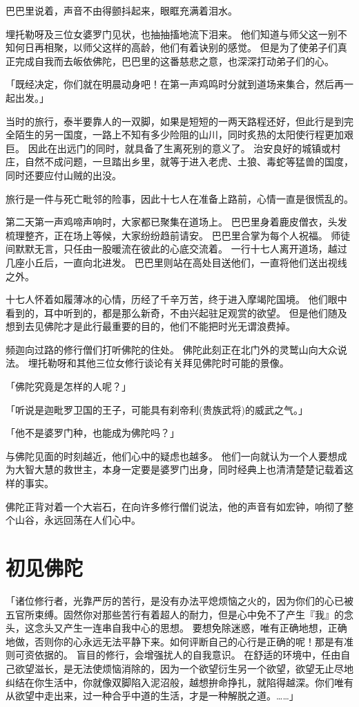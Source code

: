 \documentclass[twoside,openany]{book}
\begin{document}
巴巴里说着，声音不由得颤抖起来，眼眶充满着泪水。

埋托勒呀及三位女婆罗门见状，也抽抽搐地流下泪来。
他们知道与师父这一别不知何日再相聚，以师父这样的高龄，他们有着诀别的感觉。
但是为了使弟子们真正完成自我而去皈依佛陀，巴巴里的这番慈悲之意，也深深打动弟子们的心。

「既经决定，你们就在明晨动身吧！在第一声鸡鸣时分就到道场来集合，然后再一起出发。」

当时的旅行，泰半要靠人的一双脚，如果是短短的一两天路程还好，但此行是到完全陌生的另一国度，一路上不知有多少险阻的山川，同时炙热的太阳使行程更加艰巨。
因此在出远门的同时，就具备了生离死别的意义了。
治安良好的城镇或村庄，自然不成问题，一旦踏出乡里，就等于进入老虎、土狼、毒蛇等猛兽的国度，同时还要应付山贼的出没。

旅行是一件与死亡毗邻的险事，因此十七人在准备上路前，心情一直是很慌乱的。

第二天第一声鸡啼声响时，大家都已聚集在道场上。
巴巴里身着鹿皮僧衣，头发梳理整齐，正在场上等候，大家纷纷趋前请安。
巴巴里合掌为每个人祝福。
师徒间默默无言，只任由一股暖流在彼此的心底交流着。
一行十七人离开道场，越过几座小丘后，一直向北进发。
巴巴里则站在高处目送他们，一直将他们送出视线之外。

十七人怀着如履薄冰的心情，历经了千辛万苦，终于进入摩竭陀国境。
他们眼中看到的，耳中听到的，都是那么新奇，不由兴起驻足观赏的欲望。
但是他们随及想到去见佛陀才是此行最重要的目的，他们不能把时光无谓浪费掉。

频迦向过路的修行僧们打听佛陀的住处。
佛陀此刻正在北门外的灵鹫山向大众说法。
埋托勒呀和其他三位女修行谈论有关拜见佛陀时可能的景像。

「佛陀究竟是怎样的人呢？」

「听说是迦毗罗卫国的王子，可能具有刹帝利(贵族武将)的威武之气。」

「他不是婆罗门种，也能成为佛陀吗？」

与佛陀见面的时刻越近，他们心中的疑虑也越多。
他们一向就认为一个人要想成为大智大慧的救世主，本身一定要是婆罗门出身，同时经典上也清清楚楚记载着这样的事实。

佛陀正背对着一个大岩石，在向许多修行僧们说法，他的声音有如宏钟，响彻了整个山谷，永远回荡在人们心中。

\section{初见佛陀}\label{sec5.2}

「诸位修行者，光靠严厉的苦行，是没有办法平熄烦恼之火的，因为你们的心已被五官所束缚。固然你对那些苦行有着超人的耐力，但是心中免不了产生『我』的念头，这念头又产生一连串自我中心的思想。
要想免除迷惑，唯有正确地想，正确地做，否则你的心永远无法平静下来。如何评断自己的心行是正确的呢！那是有准则可资依据的。
盲目的修行，会增强扰人的自我意识。
在舒适的环境中，任由自己欲望滋长，是无法使烦恼消除的，因为一个欲望衍生另一个欲望，欲望无止尽地纠结在你生活中，你就像双脚陷入泥沼般，越想拚命挣扎，就陷得越深。你们唯有从欲望中走出来，过一种合乎中道的生活，才是一种解脱之道。……」
\end{document}
